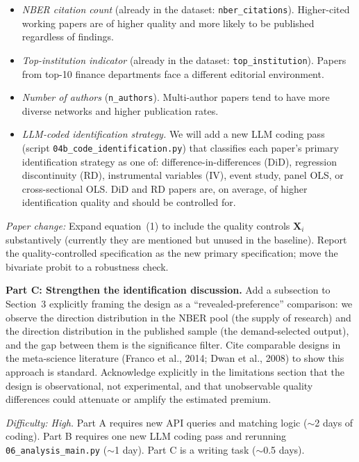 \documentclass[12pt]{article}
\begin{document}
\begin{itemize}
  \item \textit{NBER citation count} (already in the dataset:
        \texttt{nber\_citations}).  Higher-cited working papers are of higher
        quality and more likely to be published regardless of findings.

  \item \textit{Top-institution indicator} (already in the dataset:
        \texttt{top\_institution}).  Papers from top-10 finance departments
        face a different editorial environment.

  \item \textit{Number of authors} (\texttt{n\_authors}).  Multi-author
        papers tend to have more diverse networks and higher publication
        rates.

  \item \textit{LLM-coded identification strategy.}  We will add a new
        LLM coding pass (script \texttt{04b\_code\_identification.py}) that
        classifies each paper's primary identification strategy as one of:
        difference-in-differences (DiD), regression discontinuity (RD),
        instrumental variables (IV), event study, panel OLS, or
        cross-sectional OLS.  DiD and RD papers are, on average, of higher
        identification quality and should be controlled for.
\end{itemize}

\textit{Paper change:} Expand equation~(1) to include the quality controls
$\mathbf{X}_i$ substantively (currently they are mentioned but unused in the
baseline).  Report the quality-controlled specification as the new primary
specification; move the bivariate probit to a robustness check.

\textbf{Part C: Strengthen the identification discussion.}
Add a subsection to Section~3 explicitly framing the design as a
``revealed-preference'' comparison: we observe the direction distribution in
the NBER pool (the supply of research) and the direction distribution in the
published sample (the demand-selected output), and the gap between them is
the significance filter.  Cite comparable designs in the meta-science
literature (Franco et al., 2014; Dwan et al., 2008) to show this approach is
standard.  Acknowledge explicitly in the limitations section that the design
is observational, not experimental, and that unobservable quality differences
could attenuate or amplify the estimated premium.

\textit{Difficulty: High.}  Part A requires new API queries and matching
logic ($\sim$2 days of coding).  Part B requires one new LLM coding pass and
rerunning \texttt{06\_analysis\_main.py} ($\sim$1 day).  Part C is a
writing task ($\sim$0.5 days).
\end{document}
